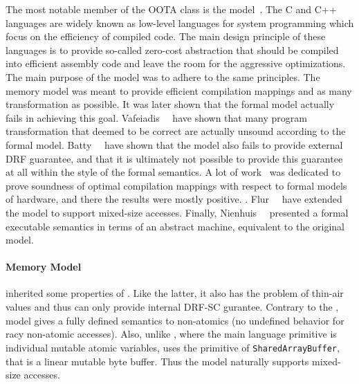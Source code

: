 The most notable member of the OOTA class is the \CMM model~\cite{Batty-al:POPL11}.
The C and C++ languages are widely known as low-level languages 
for system programming which focus on the efficiency of compiled code. 
The main design principle of these languages is to provide
so-called zero-cost abstraction that should be compiled 
into efficient assembly code and leave the room 
for the aggressive optimizations. 
The main purpose of the \CMM model was to adhere 
to the same principles. The memory model 
was meant to provide efficient compilation mappings 
and as many transformation as possible.
It was later shown that the formal model actually 
fails in achieving this goal. 
Vafeiadis~\etal~\cite{Vafeiadis-al:POPL15} have shown
that many program transformation that deemed to be correct
are actually unsound according to the formal model. 
Batty~\etal~\cite{Batty-al:ESOP15} have shown that 
the model also fails to provide external DRF guarantee, 
and that it is ultimately not possible to provide this guarantee
at all within the style of the \CMM formal semantics.
A lot of work~\cite{Batty-al:POPL11, Sarkar-al:PLDI12, Batty-al:POPL12, Batty-al:POPL16} 
was dedicated to prove soundness of optimal compilation mappings 
with respect to formal models of hardware, 
and there the results were mostly positive.
. 
Flur~\etal~\cite{Flur-al:POPL17} have extended the model 
to support mixed-size accesses.
Finally, Nienhuis~\etal~\cite{Nienhuis-al:OOPSLA16} presented 
a formal executable semantics in terms of an abstract machine, 
equivalent to the original \CMM model. 

\paragraph{\JS Memory Model}

\JSMM inherited  some properties of \CMM.
Like the latter, it also has the problem of thin-air values
and thus can only provide internal DRF-SC gurantee. 
Contrary to the \CMM, \JS model gives a fully defined 
semantics to non-atomics 
(\ie no undefined behavior for racy non-atomic accesses).  
Also, unlike \CMM, where the main language primitive is 
individual mutable atomic variables, \JSMM uses 
the primitive of \texttt{SharedArrayBuffer},
that is a linear mutable byte buffer.
Thus the model naturally supports mixed-size accesses.

